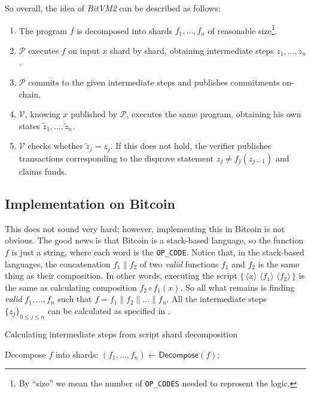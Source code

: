 \documentclass{iacrtrans}
\newcommand{\elem}[1]{\, \langle #1 \rangle \,}
\newcommand{\script}[1]{ $\big\{ #1 \big\}$ }
\begin{document}
So overall, the idea of \textit{BitVM2} can be described as follows:
\begin{enumerate}
  \item The program $f$ is decomposed into shards $f_1,\dots,f_n$ of
    reasonable size\footnote{By ``size'' we mean the number of
    \texttt{OP\_CODES} needed to represent the logic.}.
  \item $\mathcal{P}$ executes $f$ on input ${x}$ shard by shard, obtaining
    intermediate steps ${z}_1,\dots,{z}_n$.
  \item $\mathcal{P}$ commits to the given intermediate steps and publishes
    commitments on-chain.
  \item $\mathcal{V}$, knowing ${x}$ published by $\mathcal{P}$, executes the
    same program, obtaining his own states
    $\widetilde{z}_1,\dots,\widetilde{z}_n$.
  \item $\mathcal{V}$ checks whether $\widetilde{z}_j = z_j$. If this does not
    hold, the verifier publishes transactions corresponding to the disprove
    statement $z_j \neq f_j(z_{j-1})$ and claims funds.
\end{enumerate}

\subsection{Implementation on Bitcoin}

This does not sound very hard; however, implementing this in Bitcoin is not
obvious. The good news is that Bitcoin is a stack-based language, so the
function $f$ is just a string, where each word is the \texttt{OP\_CODE}. Notice
that, in the stack-based languages, the concatenation $f_1 \parallel f_2$ of two
\textit{valid} functions $f_1$ and $f_2$ is the same thing as their composition.
In other words, executing the script \script{\elem{x} \elem{f_1} \elem{f_2}} is
the same as calculating composition $f_2 \circ f_1(x)$. So all what remains is
finding \textit{valid} $f_1,\dots,f_n$ such that $f = f_1 \parallel f_{2}
\parallel \dots \parallel f_n$. All the intermediate steps ${\{z_j\}}_{0 \leq j
\leq n}$ can be calculated as specified in .

\begin{algorithm}[H]
  \caption{Calculating intermediate steps from script shard decomposition}

  Decompose $f$ into shards: $(f_1,\dots,f_n) \gets \mathsf{Decompose}(f)$;

  \For{$i \in \{1,\dots,n\}$}{
    $z_i \gets \mathsf{Exec}(\{\elem{z_{i-1}} \elem{f_i}\})$;
  }

\end{algorithm}\label{alg:intermediate_steps}
\end{document}
